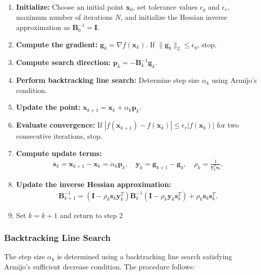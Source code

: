 \documentclass[12pt]{article}
\begin{document}
\begin{enumerate}
    \item \textbf{Initialize:} Choose an initial point \( \mathbf{x}_0 \), set tolerance values $\epsilon_g$ and $\epsilon_r$, maximum number of iterations $N$, and initialize the Hessian inverse approximation as \( \mathbf{B}_0^{-1} = \mathbf{I} \).
    \item \textbf{Compute the gradient:} \( \mathbf{g}_k = \nabla f(\mathbf{x}_k) \). If \( \|\mathbf{g}_k\|_2 \leq \epsilon_g \), stop.
    \item \textbf{Compute search direction:} \( \mathbf{p}_k = -\mathbf{B}_k^{-1} \mathbf{g}_k \).
    \item \textbf{Perform backtracking line search:} Determine step size \( \alpha_k \) using Armijo’s condition.
    \item \textbf{Update the point:} \( \mathbf{x}_{k+1} = \mathbf{x}_k + \alpha_k \mathbf{p}_k \).
    \item \textbf{Evaluate convergence:} If \( |f(\mathbf{x}_{k+1}) - f(\mathbf{x}_k)| \leq \epsilon_r |f(\mathbf{x}_k)| \) for two consecutive iterations, stop.
    \item \textbf{Compute update terms:}
    \begin{align*}
        \mathbf{s}_k = \mathbf{x}_{k+1} - \mathbf{x}_k = \alpha_k \mathbf{p}_k, \quad
        \mathbf{y}_k = \mathbf{g}_{k+1} - \mathbf{g}_k, \quad
        \rho_k = \frac{1}{\mathbf{y}_k^T \mathbf{s}_k}.
    \end{align*}
    \item \textbf{Update the inverse Hessian approximation:}
    \begin{align*}
        \mathbf{B}_{k+1}^{-1} = \left( \mathbf{I} - \rho_k \mathbf{s}_k \mathbf{y}_k^T \right) \mathbf{B}_k^{-1} 
        \left( \mathbf{I} - \rho_k \mathbf{y}_k \mathbf{s}_k^T \right) + \rho_k \mathbf{s}_k \mathbf{s}_k^T.
    \end{align*}
    \item Set \( k = k+1 \) and return to step 2
\end{enumerate}

\subsubsection{Backtracking Line Search}

The step size \( \alpha_k \) is determined using a backtracking line search satisfying Armijo’s sufficient decrease condition. The procedure follows:
\end{document}
